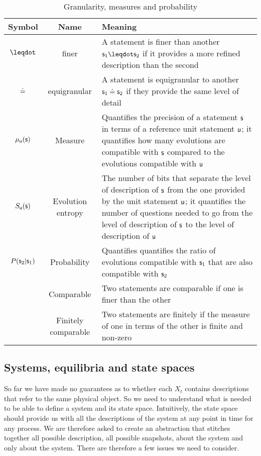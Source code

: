 \documentclass[letterpaper]{article}
\begin{document}
\begin{table}[h!]
	\centering
	\begin{tabular}[h]{|c|c|p{6cm}|}
		\hline 
		Symbol & Name & Meaning \\ 
		\hline 
		$\finer$ & finer & A statement is finer than another $\stmt_1 \finer \stmt_2$ if it provides a more refined description than the second \\ 
		\hline 
		$\eqgran$ & equigranular & A statement is equigranular to another $\stmt_1 \eqgran \stmt_2$ if they provide the same level of detail \\ 
		\hline 
		$\mu_{\stmt[u]}(\stmt)$ & Measure & Quantifies the precision of a statement $\stmt$ in terms of a reference unit statement $\stmt[u]$; it quantifies how many evolutions are compatible with $\stmt$ compared to the evolutions compatible with $\stmt[u]$  \\ 
		\hline 
		$S_{\stmt[u]}(\stmt)$ & Evolution entropy & The number of bits that separate the level of description of $\stmt$ from the one provided by the unit statement $\stmt[u]$; it quantifies the number of questions needed to go from the level of description of $\stmt$ to the level of description of $\stmt[u]$  \\ 
		\hline 
		$P(\stmt_2 | \stmt_1)$ & Probability & Quantifies quantifies the ratio of evolutions compatible with $\stmt_1$ that are also compatible with $\stmt_2$  \\ 
		\hline 
		 & Comparable & Two statements are comparable if one is finer than the other \\ 
		\hline 
		 & Finitely comparable & Two statements are finitely if the measure of one in terms of the other is finite and non-zero \\ 
		\hline 
	\end{tabular} 
	\caption{Granularity, measures and probability}
	\label{table:states}
\end{table}

\subsection{Systems, equilibria and state spaces}

So far we have made no guarantees as to whether each $X_t$ contains descriptions that refer to the same physical object. So we need to understand what is needed to be able to define a system and its state space. Intuitively, the state space should provide us with all the descriptions of the system at any point in time for any process. We are therefore asked to create an abstraction that stitches together all possible description, all possible snapshots, about the system and only about the system. There are therefore a few issues we need to consider.
\end{document}
